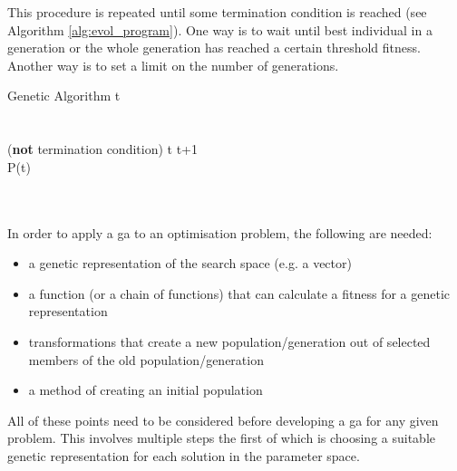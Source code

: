 This procedure is repeated until some termination condition is reached (see Algorithm \ref{alg:evol_program}). One way is to wait until best individual in a generation or the whole generation has reached a certain threshold fitness.  Another way is to set a limit on the number of generations. 



\begin{pseudocode}{Genetic Algorithm}{ }
\label{alg:evol_program}
t  \\
\\
\\
\WHILE (\textrm{\textbf{not} termination condition}) \DO
\BEGIN
t \gets t+1\\
P(t) \GETS {}\\
\\
\\
\END
\ENDMAIN
\end{pseudocode}



In order to apply a \gls{ga} to an optimisation problem, the following are needed:
\begin{itemize}
\item a genetic representation of the search space (e.g. a vector)
\item a function (or a chain of functions) that can calculate a fitness for a genetic representation
\item transformations that create a new population/generation out of selected members of the old population/generation
\item a method of creating an initial population
\end{itemize}


All of these points need to be considered before developing a \gls{ga} for any given problem. This involves multiple steps the first of which is choosing a suitable genetic representation for each solution in the parameter space. 

